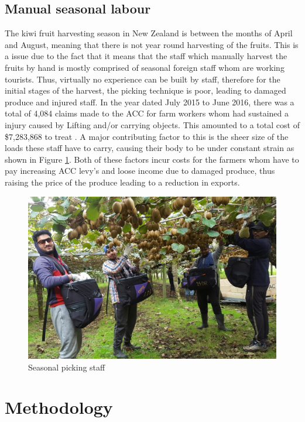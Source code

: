 \documentclass[11pt,twocolumn]{article}
\begin{document}
\subsection{Manual seasonal labour}
The kiwi fruit harvesting season in New Zealand is between the months of April and August, meaning that there is not year round harvesting of the fruits. This is a issue due to the fact that it means that the staff which manually harvest the fruits by hand is mostly comprised of seasonal foreign staff whom are working tourists. Thus, virtually no experience can be built by staff, therefore for the initial stages of the harvest, the picking technique is poor, leading to damaged produce and injured staff. In the year dated July 2015 to June 2016, there was a total of 4,084 claims made to the ACC for farm workers whom had sustained a injury caused by Lifting and/or carrying objects. This amounted to a total cost of \$7,283,868 to treat \cite{injury_statistics_tool_2017}. A major contributing factor to this is the sheer size of the loads these staff have to carry, causing their body to be under constant strain as shown in Figure \ref{fig:Picking}.  Both of these factors incur costs for the farmers whom have to pay increasing ACC levy's and loose income due to damaged produce, thus raising the price of the produce leading to a reduction in exports.
\begin{figure}[h]
\centering
\includegraphics[scale=0.2]{Pickers}
\caption{Seasonal picking staff}
\label{fig:Picking}
\end{figure}

\section{Methodology}
\end{document}
